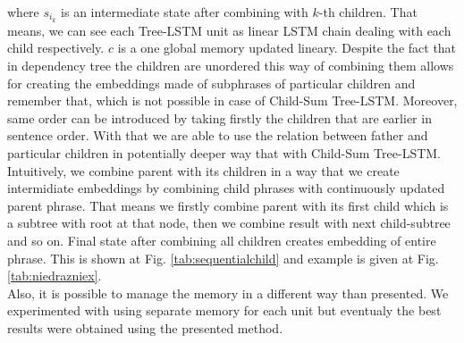 \documentclass[10pt, a4paper]{article}
\begin{document}
	where $s_{i_k}$ is an intermediate state after combining with $k$-th children. That means, we can see each Tree-LSTM unit as linear LSTM chain dealing with each child respectively. $c$ is a one global memory updated lineary.
	Despite the fact that in dependency tree the children are unordered this way of combining them allows for creating the embeddings made of subphrases of particular children and remember that, which is not possible in case of Child-Sum Tree-LSTM. Moreover, same order can be introduced by taking firstly the children that are earlier in sentence order. With that we are able to use the relation between father and particular children in potentially deeper way that with Child-Sum Tree-LSTM.\\
\indent
Intuitively, we combine parent with its children in a way that we create intermidiate embeddings by combining child phrases with continuously updated parent phrase. That means we firstly combine parent with its first child which is a subtree with root at that node, then we combine result with next child-subtree and so on. Final state after combining all children creates embedding of entire phrase. This is shown at Fig. \ref{tab:sequentialchild} and example is given at Fig. \ref{tab:niedrazniex}.\\
\indent
	Also, it is possible to manage the memory in a different way than presented. We experimented with using separate memory for each unit but eventualy the best results were obtained using the presented method.
\end{document}
